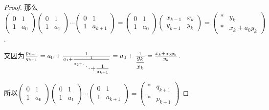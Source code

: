 \begin{problem}
\begin{proof}
            那么$\begin{pmatrix}
                0 & 1 \\
                1 & a_0
            \end{pmatrix}\begin{pmatrix}
                0 & 1 \\
                1 & a_1
            \end{pmatrix}\cdots\begin{pmatrix}
                0 & 1 \\
                1 & a_{k+1}
            \end{pmatrix}=\begin{pmatrix}
                0 & 1 \\
                1 & a_0
            \end{pmatrix}\begin{pmatrix}
                x_{k-1} & x_k \\
                y_{k-1} & y_k
            \end{pmatrix}=\begin{pmatrix}
                * & y_k \\
                * & x_k+a_0y_k
            \end{pmatrix}$.\par
            又因为$\frac{p_{k+1}}{q_{k+1}}=a_0+\frac{1}{a_1+\frac{1}{a_2+\raisebox{-.5\height}{$\ddots$}\raisebox{-1\height}{$+\tfrac{1}{a_{k+1}}$}}}=a_0+\frac{1}{\dfrac{y_k}{x_k}}=\frac{x_k+a_0y_k}{y_k}$.\par
            所以$\begin{pmatrix}
                0 & 1 \\
                1 & a_0
            \end{pmatrix}\begin{pmatrix}
                0 & 1 \\
                1 & a_1
            \end{pmatrix}\cdots\begin{pmatrix}
                0 & 1 \\
                1 & a_{k+1}
            \end{pmatrix}=\begin{pmatrix}
                * & q_{k+1} \\
                * & p_{k+1}
            \end{pmatrix}$
    \end{proof}    
\end{problem}
